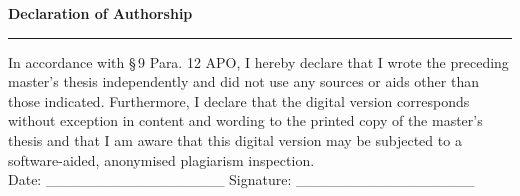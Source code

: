 \clearpage
{}
\thispagestyle{plain}



\begin{center}
    \LARGE\textbf{Declaration of Authorship}

    \vspace{0.3cm}
    \rule{0.5\linewidth}{0.4pt}
\end{center}
\vspace{0.8cm}


In accordance with \S\,9 Para. 12 APO, I hereby declare that I wrote the preceding
master's thesis independently and did not use any sources or aids other than
those indicated. Furthermore, I declare that the digital version corresponds
without exception in content and wording to the printed copy of the master's
thesis and that I am aware that this digital version may be subjected to a
software-aided, anonymised plagiarism inspection.\\


Date: \_\_\_\_\_\_\_\_\_\_\_\_\_\_\_\_\_  
Signature: \_\_\_\_\_\_\_\_\_\_\_\_\_\_\_\_\_
